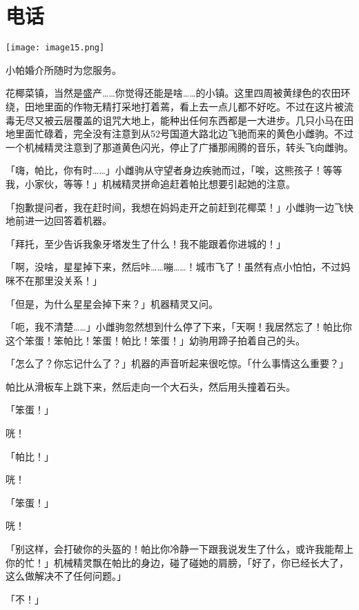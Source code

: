 \chapter{电话}

\texttt{[image: image15.png]}

\begin{intro}
小帕婚介所随时为您服务。
\end{intro}



花椰菜镇，当然是盛产……你觉得还能是啥……的小镇。这里四周被黄绿色的农田环绕，田地里面的作物无精打采地打着蔫，看上去一点儿都不好吃。不过在这片被流毒无尽又被云层覆盖的诅咒大地上，能种出任何东西都是一大进步。几只小马在田地里面忙碌着，完全没有注意到从52号国道大路北边飞驰而来的黄色小雌驹。不过一个机械精灵注意到了那道黄色闪光，停止了广播那闹腾的音乐，转头飞向雌驹。

「嗨，帕比，你有时……」小雌驹从守望者身边疾驰而过，「唉，这熊孩子！等等我，小家伙，等等！」机械精灵拼命追赶着帕比想要引起她的注意。

「抱歉提问者，我在赶时间，我想在妈妈走开之前赶到花椰菜！」小雌驹一边飞快地前进一边回答着机器。

「拜托，至少告诉我象牙塔发生了什么！我不能跟着你进城的！」

「啊，没啥，星星掉下来，然后咔……嘣……！城市飞了！虽然有点小怕怕，不过妈咪不在那里没关系！」

「但是，为什么星星会掉下来？」机器精灵又问。

「呃，我不清楚……」小雌驹忽然想到什么停了下来，「天啊！我居然忘了！帕比你这个笨蛋！笨帕比！笨蛋！帕比！笨蛋！」幼驹用蹄子拍着自己的头。

「怎么了？你忘记什么了？」机器的声音听起来很吃惊。「什么事情这么重要？」

帕比从滑板车上跳下来，然后走向一个大石头，然后用头撞着石头。

「笨蛋！」

咣！

「帕比！」

咣！

「笨蛋！」

咣！

「别这样，会打破你的头盔的！帕比你冷静一下跟我说发生了什么，或许我能帮上你的忙！」机械精灵飘在帕比的身边，碰了碰她的肩膀，「好了，你已经长大了，这么做解决不了任何问题。」

「不！」


